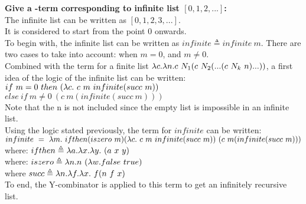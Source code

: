 \documentclass{article}
\begin{document}
\begin{Large}
		\textbf{Give a \lamb -term corresponding to infinite list $[0,1,2,...]$:}\\
		
		The infinite list can be written as $[0,1,2,3,...]$.\\
		
		It is considered to start from the point 0 onwards.\\
		
		To begin with, the infinite list can be written as $infinite \triangleq infinite \ m$.
		There are two cases to take into account: when $m=0$, and $m \neq 0$.\\
		
		Combined with the term for a finite list $\lambda c.\lambda n.c \ N_1 (c \ N_2 ( ... ( c \ N_k \ n)...))$, a first idea of the logic of the infinite list can be written:\\
		
		$if \ m=0 \ then \ (\lambda c.\ c \ m \ infinite (succ \ m))$\\
		$else \ if \ m \neq 0 \ (c \ m ( infinite (succ \ m))) $\\
		
		Note that the n is not included since the empty list is impossible in an infinite list.\\
		
		Using the logic stated previously, the term for $infinite$ can be written:\\
		
		$infinite \ = \ \la m. \ ifthen(iszero \ m)(\la c.\ c \ m \ infinite (succ \ m)) \ (c \ m ( infinite (succ \ m)))$\\
		
		where: $ifthen \triangleq \la a.\la x.\la y. \ (a \ x \ y)$\\
		where: $iszero \triangleq \lambda n.n\ (\lambda w. false \ true)$\\
		where $succ \triangleq \la n.\la f . \la x. \ f(n\ f \ x)$\\
		
		To end, the Y-combinator is applied to this term to get an infinitely recursive list.
		
	\end{Large}
\end{document}
